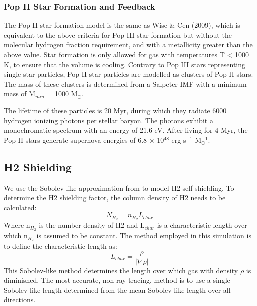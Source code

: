 \documentclass[a4paper,fleqn,usenatbib]{mnras}
\begin{document}
\subsubsection{Pop II  Star Formation and Feedback}
The Pop II star formation model is the same as Wise \& Cen (2009), which is equivalent to the above criteria for Pop III star formation but without the molecular hydrogen fraction requirement, and with a metallicity greater than the above value. Star formation is only allowed for gas with temperatures T < 1000 K, to ensure that the volume is cooling. Contrary to Pop III stars representing single star particles, Pop II star particles are modelled as clusters of Pop II stars. The mass of these clusters is determined from a Salpeter IMF with a minimum mass of M$_{min}$ = 1000 M$_{\odot}$. 

The lifetime of these particles is 20 Myr, during which they radiate 6000 hydrogen ionizing photons per stellar baryon. The photons exhibit a monochromatic spectrum with an energy of 21.6 eV. After living for 4 Myr, the Pop II stars generate supernova energies of 6.8 $\times$ 10$^{48}$ erg s$^{-1}$ M$_{\odot}^{-1}$.

\subsection{H2 Shielding}
We use the Sobolev-like approximation from \citet{Wolcott11} to model H2 self-shielding. To determine the H2 shielding factor, the column density of H2 needs to be calculated:
\begin{equation}
	N_{H_{2}} = n_{H_{2}}L_{char}
\end{equation}
Where n$_{H_{2}}$ is the number density of H2 and L$_{char}$ is a characteristic length over which n$_{H_{2}}$ is assumed to be constant. The method employed in this simulation is to define the characteristic length as:
\begin{equation}
	L_{char} = \frac{\rho}{|\nabla \rho|}
\end{equation}
This Sobolev-like method determines the length over which gas with density $\rho$ is diminished. The most accurate, non-ray tracing, method is to use a single Sobolev-like length determined from the mean Sobolev-like length over all directions. 
\end{document}
